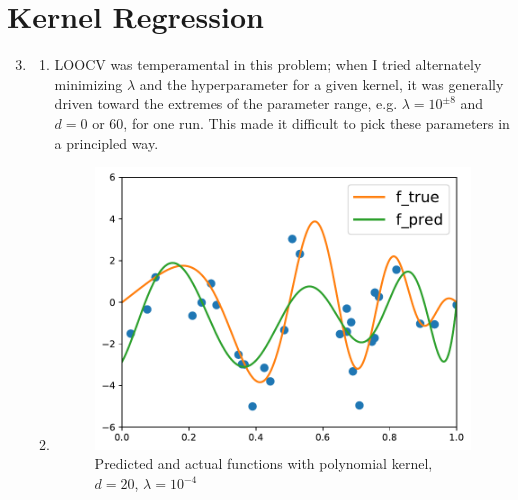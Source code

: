 \documentclass[11pt,letterpaper]{article}
\theoremstyle{definition}
\theoremstyle{plain}
\numberwithin{equation}{section}
\numberwithin{figure}{section}
\begin{document}
\section{Kernel Regression}
\begin{enumerate}
\setcounter{enumi}{2}
	\item \begin{enumerate}
		\item LOOCV was temperamental in this problem; when I tried alternately minimizing $\lambda$ and the hyperparameter for a given kernel, it was generally driven toward the extremes of the parameter range, e.g. $\lambda=10^{\pm 8}$ and $d = 0$ or 60, for one run. This made it difficult to pick these parameters in a principled way.

		\item 

		\begin{figure}[H]
			\centering
			\includegraphics[width=.6\textwidth]{figures/poly_ker_d20_lm4.pdf}
			\caption{Predicted and actual functions with polynomial kernel, $d=20$, $\lambda = 10^{-4}$}
		\end{figure}


\end{enumerate}
\end{enumerate}
\end{document}
